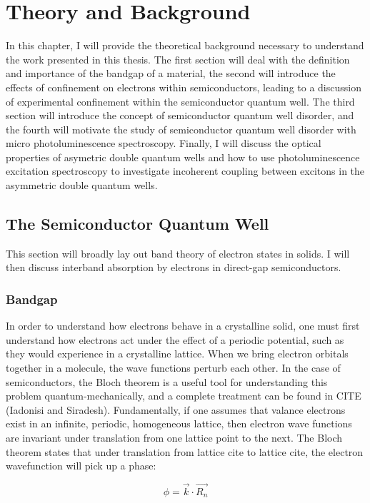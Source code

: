 \chapter{Theory and Background}
In this chapter, I will provide the theoretical background necessary to understand the work presented in this thesis. The first section will deal with the definition and importance of the bandgap of a material, the second will introduce the effects of confinement on electrons within semiconductors, leading to a discussion of experimental confinement within the semiconductor quantum well. The third section will introduce the concept of semiconductor quantum well disorder, and the fourth will motivate the study of semiconductor quantum well disorder with micro photoluminescence spectroscopy. Finally, I will discuss the optical properties of asymetric double quantum wells and how to use photoluminescence excitation spectroscopy to investigate incoherent coupling between excitons in the asymmetric double quantum wells.

\section{The Semiconductor Quantum Well}
This section will broadly lay out band theory of electron states in solids. I will then discuss interband absorption by electrons in direct-gap semiconductors. 
\subsection{Bandgap}

\indent In order to understand how electrons behave in a crystalline solid, one must first understand how electrons act under the effect of a periodic potential, such as they would experience in a crystalline lattice. When we bring electron orbitals together in a molecule, the wave functions perturb each other. In the case of semiconductors, the Bloch theorem is a useful tool for understanding this problem quantum-mechanically, and a complete treatment can be found in CITE (Iadonisi and Siradesh). Fundamentally, if one assumes that valance electrons exist in an infinite, periodic, homogeneous lattice, then electron wave functions are invariant under translation from one lattice point to the next. The Bloch theorem states that under translation from lattice cite to lattice cite, the electron wavefunction will pick up a phase:

\begin{equation}
\phi = \vec{k}\cdot \vec{R_n}
\end{equation}
 
